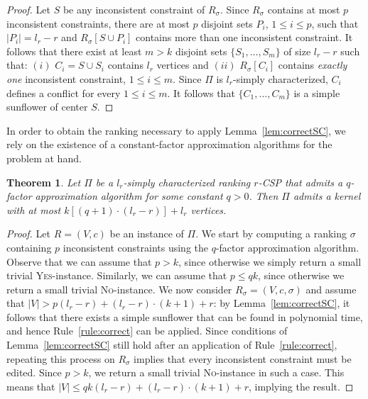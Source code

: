 \documentclass[11pt]{article}
\newtheorem{theorem}{Theorem}[section]
\begin{document}
\begin{proof}
	Let $S$ be any inconsistent constraint of $R_\sigma$. Since $R_\sigma$ contains at 
	most $p$ inconsistent constraints, there are at most $p$ disjoint sets $P_i$, $1 \leqslant i \leqslant p$, such that $|P_i| = l_r - r$ and 
	$R_\sigma[S \cup P_i]$ contains more than one inconsistent constraint. It follows that there exist at least $m > k$ disjoint sets $\{S_1, \ldots, S_m\}$ of size $l_r - r$ such that: $(i)$ $C_i = S \cup S_i$ contains $l_r$ vertices and $(ii)$ $R_\sigma[C_i]$ contains \emph{exactly one} inconsistent constraint, $1 \leqslant i \leqslant m$. Since $\Pi$ is $l_r$-simply  characterized,  $C_i$ defines a conflict for every $1 \leqslant i \leqslant m$. It follows that $\{C_1, \ldots, C_m\}$ is a simple sunflower of center $S$.\end{proof}

In order to obtain the ranking necessary to apply Lemma~\ref{lem:correctSC}, we rely on the existence of a constant-factor approximation algorithms for the problem at hand. 

\begin{theorem}
\label{thm:kernelSC}
	Let $\Pi$ be a $l_r$-simply  characterized ranking $r$-CSP that admits a $q$-factor approximation algorithm for some constant $q > 0$. Then $\Pi$ admits a kernel with at most $k[(q+1) \cdot (l_r - r)] + l_r$ vertices.
\end{theorem}

\begin{proof}
	Let $R = (V, c)$ be an instance of $\Pi$. We start by computing a ranking $\sigma$ containing $p$ inconsistent constraints using the $q$-factor approximation algorithm. Observe that we can assume that $p > k$, since otherwise we simply return a small trivial \textsc{Yes}-instance. Similarly, we can assume that $p \leqslant qk$, since otherwise we return a small trivial \textsc{No}-instance. We now consider $R_\sigma = (V, c, \sigma)$ and assume that $|V| > p(l_r - r) + (l_r - r) \cdot (k+1) + r$: by Lemma~\ref{lem:correctSC}, it follows that there exists a simple sunflower that can be found in polynomial time, and hence Rule~\ref{rule:correct} can be applied. Since conditions of Lemma~\ref{lem:correctSC} still hold after an application of Rule~\ref{rule:correct}, repeating this process on $R_\sigma$ implies that every inconsistent constraint must be edited. Since $p > k$, we return a small trivial \textsc{No}-instance in such a case. This means that $|V| \leqslant qk(l_r - r) + (l_r - r) \cdot (k+1) + r$, implying the result.
 \end{proof}
\end{document}
